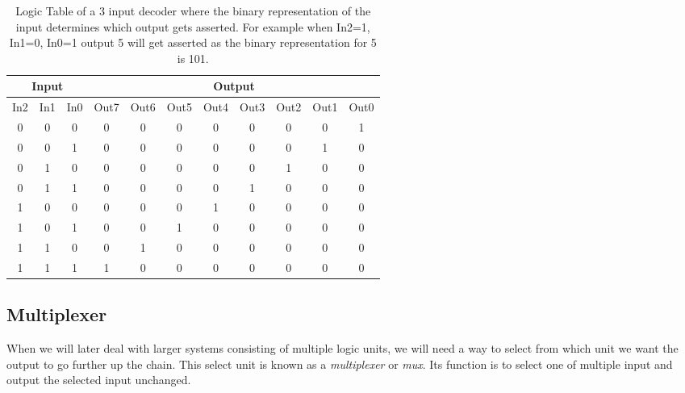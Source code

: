             \begin{table}[h!]
                \centering
                \begin{tabular}{|c|c|c||c|c|c|c|c|c|c|c|}
                    \hline
                    \multicolumn{3}{|c||}{\textbf{Input}}& \multicolumn{8}{c|}{\textbf{Output}}                  \\ \hline
                    In2        & In1        & In0        & Out7 & Out6 & Out5 & Out4 & Out3 & Out2 & Out1 & Out0 \\ \hline
                    0          & 0          & 0          & 0    & 0    & 0    & 0    & 0    & 0    & 0    & 1    \\ \hline
                    0          & 0          & 1          & 0    & 0    & 0    & 0    & 0    & 0    & 1    & 0    \\ \hline
                    0          & 1          & 0          & 0    & 0    & 0    & 0    & 0    & 1    & 0    & 0    \\ \hline
                    0          & 1          & 1          & 0    & 0    & 0    & 0    & 1    & 0    & 0    & 0    \\ \hline
                    1          & 0          & 0          & 0    & 0    & 0    & 1    & 0    & 0    & 0    & 0    \\ \hline
                    1          & 0          & 1          & 0    & 0    & 1    & 0    & 0    & 0    & 0    & 0    \\ \hline
                    1          & 1          & 0          & 0    & 1    & 0    & 0    & 0    & 0    & 0    & 0    \\ \hline
                    1          & 1          & 1          & 1    & 0    & 0    & 0    & 0    & 0    & 0    & 0    \\ \hline
                \end{tabular}
                \caption{Logic Table of a 3 input decoder where the binary representation of the input determines which output gets asserted. For example when In2=1, In1=0, In0=1 output 5 will get asserted as the binary representation for 5 is 101.}
                \label{LogicTable:Decoder}
            \end{table}
        
        \subsection{Multiplexer}\label{section:Multiplexer}
        
            When we will later deal with larger systems consisting of multiple logic units, we will need a way to select from which unit we want the output to go further up the chain. This select unit is known as a \textit{multiplexer} or \textit{mux}. Its function is to select one of multiple input and output the selected input unchanged.
            
